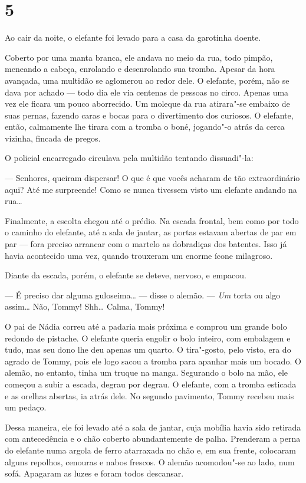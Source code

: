 \section{5}

Ao cair da noite, o elefante foi levado para a casa da garotinha doente.

Coberto por uma manta branca, ele andava no meio da rua, todo pimpão,
meneando a cabeça, enrolando e desenrolando sua tromba. Apesar da hora
avançada, uma multidão se aglomerou ao redor dele. O elefante, porém,
não se dava por achado --- todo dia ele via centenas de pessoas no
circo. Apenas uma vez ele ficara um pouco aborrecido. Um moleque da rua
atirara"-se embaixo de suas pernas, fazendo caras e bocas para
o divertimento dos curiosos. O elefante, então, calmamente lhe tirara
com a tromba o boné, jogando"-o atrás da cerca vizinha, fincada de
pregos.

O policial encarregado circulava pela multidão tentando dissuadi"-la:

--- Senhores, queiram dispersar! O que é que vocês acharam de tão
extraordinário aqui? Até me surpreende! Como se nunca tivessem visto um
elefante andando na rua\ldots{}

Finalmente, a escolta chegou até o prédio. Na escada frontal, bem como
por todo o caminho do elefante, até a sala de jantar, as portas estavam
abertas de par em par --- fora preciso arrancar com o martelo as
dobradiças dos batentes. Isso já havia acontecido uma vez, quando
trouxeram um enorme ícone milagroso.

Diante da escada, porém, o elefante se deteve, nervoso, e empacou.

--- É preciso dar alguma guloseima\ldots{} --- disse o alemão. --- \emph{Um}
torta ou algo assim\ldots{} Não, Tommy! Shh\ldots{} Calma, Tommy!

O pai de Nádia correu até a padaria mais próxima e comprou um grande
bolo redondo de pistache. O elefante queria engolir o bolo inteiro, com
embalagem e tudo, mas seu dono lhe deu apenas um quarto. O tira"-gosto,
pelo visto, era do agrado de Tommy, pois ele logo sacou a tromba para
apanhar mais um bocado. O alemão, no entanto, tinha um truque na manga.
Segurando o bolo na mão, ele começou a subir a escada, degrau por
degrau. O elefante, com a tromba esticada e as orelhas abertas, ia atrás
dele. No segundo pavimento, Tommy recebeu mais um pedaço.

Dessa maneira, ele foi levado até a sala de jantar, cuja mobília havia sido retirada com antecedência e o chão coberto abundantemente de palha. Prenderam a perna do elefante numa argola de ferro
atarraxada no chão e, em sua frente, colocaram alguns repolhos, cenouras
e nabos frescos. O alemão acomodou"-se ao lado, num sofá. Apagaram as
luzes e foram todos descansar.


